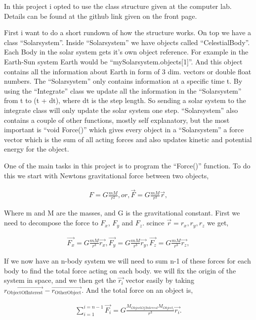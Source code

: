 \documentclass[norsk,a4paper,12pt]{article}
\begin{document}
In this project i opted  to use the class structure given at the computer lab. Details can be found at 
the github link given on the front page. 

First i want to do a short rundown of how the structure works. On top we have a class ``Solarsystem''. Inside ``Solarsystem''
we have objects called ``CelestialBody''. Each Body in the solar system gets it's own object reference. For example 
in the Earth-Sun system Earth would be ``mySolarsystem.objects[1]''. And this object contains all the information about
Earth in form of 3 dim. vectors or double float numbers. The ``Solarsystem'' only contains information at a specific time t. By using 
the ``Integrate'' class we update all the information in the ``Solarsystem'' from t to (t + dt), where dt is the step length.
So sending a solar system to the integrate class will only update the solar system one step. ``Solarsystem'' also contains a 
couple of other functions, mostly self explanatory, but the most important is ``void Force()'' which gives every object in a ``Solarsystem''
a force vector which is the sum of all acting forces and also updates kinetic and potential energy for the object.

One of the main tasks in this project is to program the ``Force()'' function. To do this we start with Newtons gravitational 
force between two objects, 

\begin{align}
 F = G\frac{mM}{r^2}, or, \vec{F} = G\frac{mM}{r^3} \vec{r},
\end{align}

Where m and M are the masses, and G is the gravitational constant. First we need to decompose the force to $F_x$, $F_y$ and $F_z$.
scince $\vec{r} = {r_x, r_y, r_z}$ we get, 

\begin{align}
 \vec{F_x} = G\frac{mM}{r^3} \vec{r_x},  \vec{F_y} = G\frac{mM}{r^3} \vec{r_y},  \vec{F_z} = G\frac{mM}{r^3} \vec{r_z},
\end{align}

If we now have an n-body system we will need to sum n-1 of these forces for each body to find the total force acting on each body.
we will fix the origin of the system in space, and we then get the $\vec{r_i}$ vector easily by taking $\vec{r_{\text{ObjectOfInterest}}} - \vec{r_{\text{OtherObject}}}$.
And the total force on an object is, 

\begin{align}
 \sum_{i = 1}^{i = n-1}\vec{F_i} = G\frac{ M_{ObjectOfInterest} M_{Object_i} } {r^3} \vec{r_i}.
\end{align}
\end{document}
